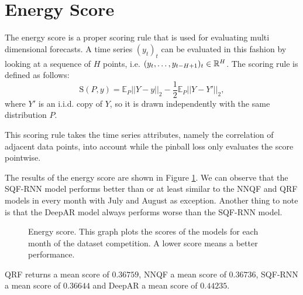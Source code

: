 \section{Energy Score}

The energy score is a proper scoring rule that is used for 
evaluating multi dimensional forecasts. A time series \((y_t)_t\) 
can be evaluated in this fashion by looking at a sequence of \(H\) 
points, i.e. \((y_t, \ldots, y_{t-H+1})_t \in \mathbb{R}^H\). 
The scoring rule is defined as follows:
\[ \mathrm{S}(P, y) = \mathbb{E}_P ||Y-y||_2 - \frac{1}{2} \mathbb{E}_P ||Y-Y'||_2, \]
where \(Y'\) is an i.i.d. copy of \(Y\), so it is drawn independently with the same distribution \(P\).

This scoring rule takes the time series attributes, namely the 
correlation of adjacent data points, into account while 
the pinball loss only evaluates the score pointwise.

The results of the energy score are shown in Figure \ref{fig:energy-score}. 
We can observe that the SQF-RNN model performs better than or at least similar 
to the NNQF and QRF models in every month with July and August as exception. 
Another thing to note is that the DeepAR model always performs worse than the SQF-RNN model. 

\begin{figure}[ht]
    \centering
    
    \caption[Energy score]{Energy score. 
    This graph plots the scores of the models for each month of the dataset competition. A lower score means a better performance.}
    \label{fig:energy-score}
\end{figure}

QRF returns a mean score of \(0.36759\), NNQF a mean score of \(0.36736\), 
SQF-RNN a mean score of \(0.36644\) and DeepAR a mean score of \(0.44235\).